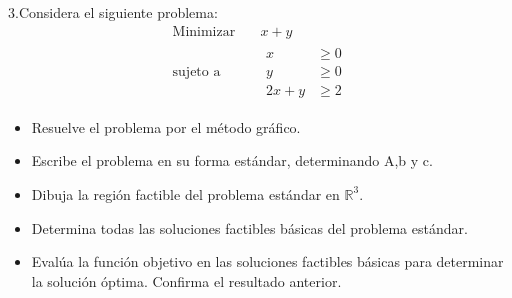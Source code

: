 \documentclass{article}
\begin{document}
3.Considera el siguiente problema:
\begin{equation*}
  \begin{aligned}
    \text{Minimizar}\quad & x+y \\
    \text{sujeto a}\quad &
    \begin{aligned}
      x & \geq 0\\
      y & \geq 0\\
      2x+y & \geq 2
      \end{aligned}    
   \end{aligned}
 \end{equation*}
 \begin{itemize}
 \item Resuelve el problema por el método gráfico.
 \item Escribe el problema en su forma estándar, determinando A,b y c.
 \item Dibuja la región factible del problema estándar en  $\mathbb{R}^3$.
 \item Determina todas las soluciones factibles básicas del problema estándar.
   \item Evalúa la función objetivo en las soluciones factibles básicas para determinar la solución óptima. Confirma el resultado anterior.
\end{itemize}
\end{document}
